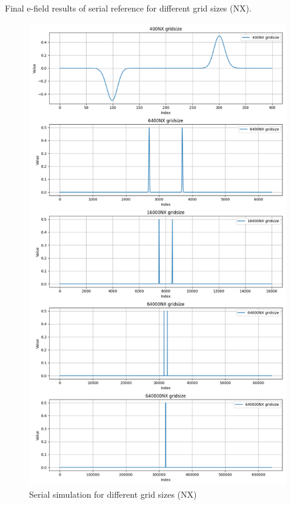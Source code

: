 \documentclass[a4paper,10pt]{article}
\begin{document}
Final e-field results of serial reference for different grid sizes (NX).
\begin{figure}[H]
  \centering
  \includegraphics[height=0.95\textheight]{../images/5_test/display_field_subplots.png}
  \caption{Serial simulation for different grid sizes (NX)}
  \label{fig:5_serial_verification}
\end{figure}

\end{document}
